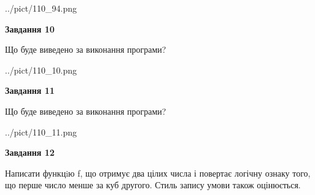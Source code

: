 \documentclass[12pt, ukrainian]{article}
\begin{document}
{\begin {large}
\begin{center}
	{../pict/110_94.png}
\end{center}
\newpage

{\begin {center}\textbf{Завдання 10}\end {center}}

Що буде виведено за виконання програми?\par
\begin{center}
	{../pict/110_10.png}
\end{center}
\newpage

{\begin {center}\textbf{Завдання 11}\end {center}}

Що буде виведено за виконання програми?\par
\begin{center}
	{../pict/110_11.png}
\end{center}
\newpage

{\begin {center}\textbf{Завдання 12}\end {center}}


Написати функцiю f, що отримує два цілих числа і повертає логічну ознаку того, що перше число менше за куб другого. Стиль запису умови також оцінюється.\par
\newpage

\end {large}}
\end{document}
